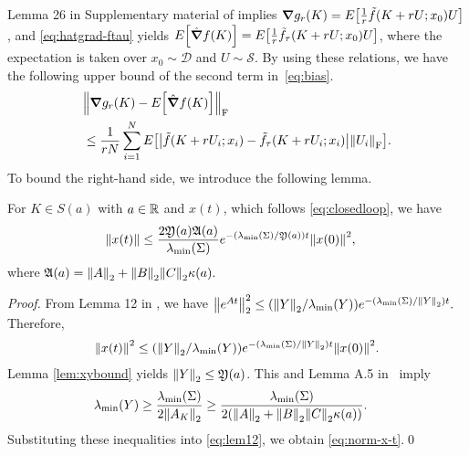 Lemma 26 in Supplementary material of \cite{fazel2018global} implies
  $\grad g_r(K)  = E\qty[\frac{1}{r}\tilde f(K+rU;x_0)U]$,
and \eqref{eq:hatgrad-ftau} yields
 $E\qty[\hat \grad f(K)]  = E\qty[\frac{1}{r} \tilde f_\tau(K+rU;x_0)U]$,
where the expectation is taken over $x_0\sim \mathcal D$ and $U\sim \mathcal S$.
By using these relations, we have the following upper bound of the second term in~\eqref{eq:bias}.
\begin{align}
         &\norm{\grad g_r(K)- E\qty[\hat\grad f(K)]}_\mathrm{F}\\
         &\leq \frac{1}{rN}\sum_{i=1}^N E\qty[\abs{\tilde f(K+rU_i;x_i)-\tilde f_\tau(K+rU_i;x_i)}\norm{U_i}_\mathrm{F}].\label{eq:biastau}
\end{align}
To bound the right-hand side, we introduce the following lemma.
\begin{lemma}\label{lem:norm-x-t}
  For $K\in S(a)$ with $a\in \mathbb{R}$ and $x(t)$, which follows \eqref{eq:closedloop}, we have
  \begin{align}
    \norm{x(t)} & \leq \frac{2\mathfrak{Y}(a)\mathfrak{A}(a)}{\lambda_{\min}(\Sigma)}e^{-(\lambda_{\min}(\Sigma)/\mathfrak{Y}(a))t}\norm{x(0)}^2,\label{eq:norm-x-t}
  \end{align}
  where 
  $
    \mathfrak{A}(a) = \norm{A}_2+\norm{B}_2\norm{C}_2\kappa(a).
  $
\end{lemma}
\begin{proof}
  From Lemma 12 in \cite{mohammadi2021convergence}, we have
  $
    \norm{e^{At}}_2^2 \leq \qty(\norm{Y}_2/\lambda_{\min}(Y))e^{-(\lambda_{\min}(\Sigma)/\norm{Y}_2)t}.
  $
  Therefore,
  \begin{align}
    \norm{x(t)}^2 %
                   \leq \qty(\norm{Y}_2/\lmin(Y))e^{-(\lmin(\Sigma)/\norm{Y}_2)t}\norm{x(0)}^2.\label{eq:lem12}
  \end{align}
  Lemma \ref{lem:xybound} yields $\norm{Y}_2  \leq \mathfrak{Y}(a)$.
  This and Lemma A.5 in~\cite{fatkhullin2021optimizing} imply
  \begin{align}
    \lambda_{\min}(Y) &\geq \frac{\lambda_{\min}(\Sigma)}{2\norm{A_K}_2} 
    \geq \frac{\lambda_{\min}(\Sigma)}{2(\norm{A}_2+\norm{B}_2\norm{C}_2\kappa(a))}.
  \end{align}
  Substituting these inequalities into \eqref{eq:lem12}, we obtain \eqref{eq:norm-x-t}.\qed
\end{proof}

